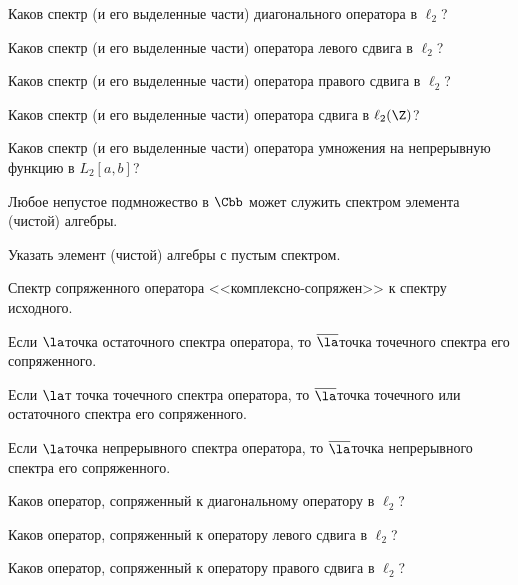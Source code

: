 \documentclass[a4paper]{article}
\begin{document}
\begin{nums}{-1}
\item Каков спектр (и его выделенные части) диагонального оператора в $\ell_2$?
\item Каков спектр (и его выделенные части) оператора левого сдвига в $\ell_2$?
\item Каков спектр (и его выделенные части) оператора правого сдвига в $\ell_2$?
\item Каков спектр (и его выделенные части) оператора сдвига в $\ell_2(\Z)$?
\item Каков спектр (и его выделенные части) оператора умножения на непрерывную
функцию в $L_2[a,b]$?
\item Любое непустое подмножество в $\Cbb$ может служить спектром элемента (чистой) алгебры.

\item Указать элемент (чистой) алгебры с пустым спектром.
\item Спектр сопряженного оператора <<комплексно-сопряжен>> к спектру исходного.

\item Если $\la$\т точка остаточного спектра оператора, то $\overline{\la}$\т точка точечного
спектра его сопряженного.
\item Если $\la$т точка точечного спектра оператора, то $\overline{\la}$\т точка точечного или
остаточного спектра его сопряженного.
\item Если $\la$\т точка непрерывного спектра оператора, то $\overline{\la}$\т точка
непрерывного спектра его сопряженного.
\item Каков оператор, сопряженный к диагональному оператору в $\ell_2$?
\item Каков оператор, сопряженный к оператору левого сдвига в $\ell_2$?
\item Каков оператор, сопряженный к оператору правого сдвига в $\ell_2$?


\end{nums}
\end{document}
